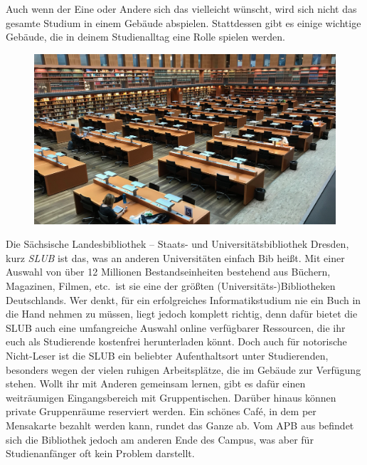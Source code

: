 
Auch wenn der Eine oder Andere sich das vielleicht wünscht, wird sich nicht das gesamte Studium in einem Gebäude abspielen.
Stattdessen gibt es einige wichtige Gebäude, die in deinem Studienalltag eine Rolle spielen werden.

\begin{figure}[b!]
    \centering
    \includegraphics[width=\linewidth]{img/slub-lesesaal}
\end{figure}


Die Sächsische Landesbibliothek – Staats- und Universitätsbibliothek Dresden, kurz \emph{SLUB} ist das, was an anderen Universitäten einfach Bib heißt.
Mit einer Auswahl von über 12 Millionen Bestandseinheiten bestehend aus Büchern, Magazinen, Filmen, etc.\ ist sie eine der größten (Universitäts-)Bibliotheken Deutschlands.
Wer denkt, für ein erfolgreiches Informatikstudium nie ein Buch in die Hand nehmen zu müssen, liegt jedoch komplett richtig, denn dafür bietet die SLUB auch eine umfangreiche Auswahl online verfügbarer Ressourcen, die ihr euch als Studierende kostenfrei herunterladen könnt.
Doch auch für notorische Nicht-Leser ist die SLUB ein beliebter Aufenthaltsort unter Studierenden, besonders wegen der vielen ruhigen Arbeitsplätze, die im Gebäude zur Verfügung stehen.
Wollt ihr mit Anderen gemeinsam lernen, gibt es dafür einen weiträumigen Eingangsbereich mit Gruppentischen.
Darüber hinaus können private Gruppenräume reserviert werden. Ein schönes Café, in dem per Mensakarte bezahlt werden kann, rundet das Ganze ab.
Vom APB aus befindet sich die Bibliothek jedoch am anderen Ende des Campus, was aber für Studienanfänger oft kein Problem darstellt.


